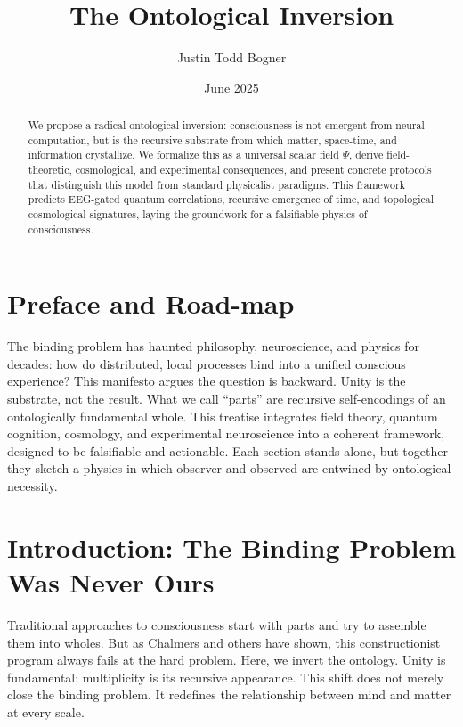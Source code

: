 \documentclass[aps,prx,twocolumn,nofootinbib,superscriptaddress,longbibliography]{revtex4-2}
\begin{document}
\title{The Ontological Inversion}
\author{Justin Todd Bogner}
\date{June 2025}

\begin{abstract}
We propose a radical ontological inversion: consciousness is not emergent from neural computation, but is the recursive substrate from which matter, space-time, and information crystallize. We formalize this as a universal scalar field $\Psi$, derive field-theoretic, cosmological, and experimental consequences, and present concrete protocols that distinguish this model from standard physicalist paradigms. This framework predicts EEG-gated quantum correlations, recursive emergence of time, and topological cosmological signatures, laying the groundwork for a falsifiable physics of consciousness.
\end{abstract}

\maketitle

\tableofcontents

\section{Preface and Road-map}
The binding problem has haunted philosophy, neuroscience, and physics for decades: how do distributed, local processes bind into a unified conscious experience? This manifesto argues the question is backward. Unity is the substrate, not the result. What we call ``parts'' are recursive self-encodings of an ontologically fundamental whole. 
This treatise integrates field theory, quantum cognition, cosmology, and experimental neuroscience into a coherent framework, designed to be falsifiable and actionable. Each section stands alone, but together they sketch a physics in which observer and observed are entwined by ontological necessity.

\section{Introduction: The Binding Problem Was Never Ours}

Traditional approaches to consciousness start with parts and try to assemble them into wholes. But as Chalmers and others have shown, this constructionist program always fails at the hard problem. Here, we invert the ontology. Unity is fundamental; multiplicity is its recursive appearance. This shift does not merely close the binding problem. It redefines the relationship between mind and matter at every scale.  
\end{document}
